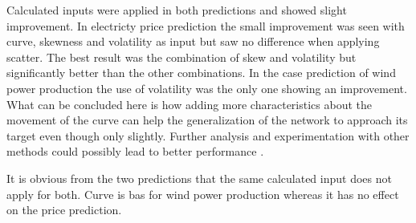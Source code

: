  Calculated inputs were applied in both predictions and showed slight improvement. In electricty price prediction the small improvement was seen with curve, skewness and volatility as input but saw no difference when applying scatter. The best result was the combination of skew and volatility but significantly better than the other combinations. In the case prediction of wind power production the use of volatility was the only one showing an improvement. What can be concluded here is how adding more characteristics about the movement of the curve can help the generalization of the network to approach its target even though only slightly. Further analysis and experimentation with other methods could possibly lead to better performance .
 
 It is obvious from the two predictions that the same calculated input does not apply for both. Curve is bas for wind power production whereas it has no effect on the price prediction.